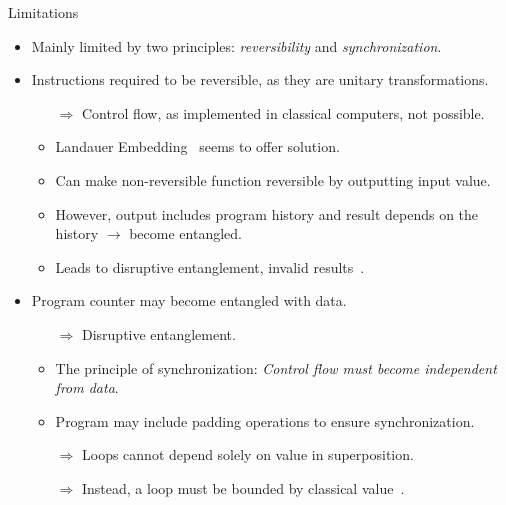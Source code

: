 \begin{frame}{Limitations}
    \begin{itemize}
        \item Mainly limited by two principles: \emph{reversibility} and \emph{synchronization}.
        \item Instructions required to be reversible, as they are unitary transformations.
        \begin{itemize}
            \item[$\Rightarrow$] Control flow, as implemented in classical computers, not possible.
            \item Landauer Embedding~\cite{Land61} seems to offer solution.
            \item Can make non-reversible function reversible by outputting input value.
            \item However, output includes program history and result depends on the history $\to$ become entangled.
            \item Leads to disruptive entanglement, invalid results~\cite{YVC24}.
        \end{itemize}
        \item Program counter may become entangled with data.
        \begin{itemize}
            \item[$\Rightarrow$] Disruptive entanglement.
            \item The principle of synchronization: \emph{Control flow must become independent from data}.
            \item Program may include padding operations to ensure synchronization.
            \item[$\Rightarrow$] Loops cannot depend solely on value in superposition.
            \item[$\Rightarrow$] Instead, a loop must be bounded by classical value~\cite{YVC24}. 
        \end{itemize} 
    \end{itemize}
\end{frame}

